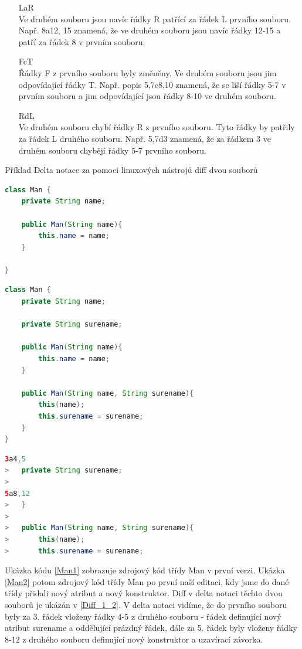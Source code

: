 \documentclass[11pt,twoside,a4paper]{book}
\begin{document}
\begin{itemize}
   	\item [LaR ] \hfill \\
   		Ve druhém souboru jsou navíc řádky R patřící za řádek L prvního souboru. 
    	Např. 8a12, 15 znamená, že ve druhém souboru jsou navíc řádky 12-15 a patří
    	za řádek 8 v prvním souboru.
	\item [FcT] \hfill \\
		Řádky F z prvního souboru byly změněny. Ve druhém souboru jsou jim
		odpovídající řádky T. Např. popis 5,7c8,10 znamená, že se liší řádky 5-7 v
		prvním souboru a jim odpovídající jsou řádky 8-10 ve druhém souboru.	 
  \item [RdL] \hfill \\
		Ve druhém souboru chybí řádky R z prvního souboru. Tyto řádky by patřily za
		řádek L druhého souboru. Např. 5,7d3 znamená, že za řádkem 3 ve druhém souboru
		chybějí řádky 5-7 prvního souboru.	  
\end{itemize}


Příklad Delta notace za pomoci linuxových
nástrojů diff dvou souborů\\
\begin{lstlisting}[language=JAVA,frame=single,caption=Man1.java,label=Man1]
class Man {
	private String name;

	public Man(String name){
		this.name = name;
	}

}
\end{lstlisting}

\begin{lstlisting}[language=JAVA,frame=single,caption=Man2.java,label=Man2]
class Man {
	private String name;

	private String surename;

	public Man(String name){
		this.name = name;
	}

	public Man(String name, String surename){
		this(name);
		this.surename = surename;
	}
}
\end{lstlisting}

\begin{lstlisting}[language=JAVA,frame=single,caption=Diff Man1
Man2,label=Diff_1_2]
3a4,5
> 	private String surename;
> 
5a8,12
> 	}
> 
> 	public Man(String name, String surename){
> 		this(name);
> 		this.surename = surename;	
\end{lstlisting}

Ukázka kódu \ref{Man1} zobrazuje zdrojový kód třídy Man v první
verzi. Ukázka \ref{Man2} potom zdrojový kód třídy Man po první naší editaci,
kdy jsme do dané třídy přidali nový atribut a nový konstruktor.
Diff v delta notaci těchto dvou souborů je ukázán v \ref{Diff_1_2}. V delta
notaci vidíme, že do prvního souboru byly za 3. řádek vloženy řádky 4-5 z
druhého souboru - řádek definující nový atribut surename a oddělující prázdný
řádek, dále za 5. řádek byly vloženy řádky 8-12 z druhého souboru definující
nový konstruktor a uzavírací závorka.\\
\end{document}

